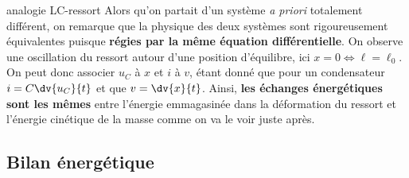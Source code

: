 \documentclass[../main/main.tex]{subfiles}
\begin{document}
\begin{rema}[label=rema:ressortlibre, sidebyside]{analogie LC-ressort}
    Alors qu'on partait d'un système \textit{a priori} totalement différent, on
    remarque que la physique des deux systèmes sont rigoureusement équivalentes
    puisque \textbf{régies par la même équation différentielle}. On observe une
    oscillation du ressort autour d'une position d'équilibre, ici $x=0
    \Leftrightarrow \ell = \ell_0$.
    \tcblower
    On peut donc associer $u_C$ à $x$ et $i$ à $v$, étant donné que pour un
    condensateur $i = C \dv{u_C}{t}$ et que $v = \dv{x}{t}$. Ainsi, \textbf{les
    échanges énergétiques sont les mêmes} entre l'énergie emmagasinée dans la
    déformation du ressort et l'énergie cinétique de la masse comme on va le
    voir juste après.
\end{rema}

\subsection{Bilan énergétique}
\end{document}

